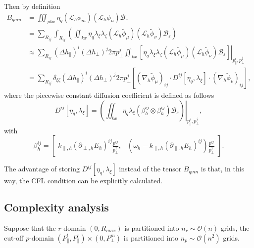 \documentclass{article}
\numberwithin{equation}{section}
\begin{document}
Then by definition
\begin{equation*}
    \begin{split}
        B_{qmn}
        &=\iiint_{pkx}\eta_{q}\left(\mathcal{L}_{h}\phi_{m}\right)\left(\mathcal{L}_{h}\phi_{n}\right)\mathcal{B}_{\varepsilon}\\
        &=\sum_{R_{ij}}\int_{R_{ij}}\left(\iint_{kx}\eta_{q}\lambda_{\xi}\lambda_{\zeta}\left(\mathcal{L}_{h}\tilde{\phi}_{\mu}\right)\left(\mathcal{L}_{h}\tilde{\phi}_{\nu}\right)\mathcal{B}_{\varepsilon}\right)\\
        &\approx\sum_{R_{ij}}\left(\Delta h_{\parallel}\right)^{i}\left(\Delta h_{\perp}\right)^{j}2\pi p_{\perp}^{j}\left.\iint_{kx}\left[\eta_{q}\lambda_{\xi}\lambda_{\zeta}\left(\mathcal{L}_{h}\tilde{\phi}_{\mu}\right)\left(\mathcal{L}_{h}\tilde{\phi}_{\nu}\right)\mathcal{B}_{\varepsilon}\right]\right\vert_{p_{\parallel}^{i},p_{\perp}^{j}}\\
        &=\sum_{R_{ij}}\delta_{\xi\zeta}\left(\Delta h_{\parallel}\right)^{i}\left(\Delta h_{\perp}\right)^{j}2\pi p_{\perp}^{j}\left[\left(\nabla_{h}\tilde{\phi}_{\mu}\right)_{ij}\cdot D^{ij}[\eta_{q},\lambda_{\xi}]\cdot\left(\nabla_{h}\tilde{\phi}_{\nu}\right)_{ij}\right],
    \end{split}
\end{equation*}
where the piecewise constant diffusion coefficient is defined as follows
\begin{equation*}
    D^{ij}[\eta_{q},\lambda_{\xi}]=\left.\left(\iint_{kx}\eta_{q}\lambda_{\xi}\left(\beta_{h}^{ij}\otimes\beta_{h}^{ij}\right)\mathcal{B}_{\varepsilon}\right)\right|_{p_{\parallel}^{i},p_{\perp}^{j}},
\end{equation*}
with
\begin{equation*}
    \beta_{h}^{ij}=\left[\begin{array}{cc}
k_{\parallel,h}\left(\partial_{\perp,h}E_{h}\right)^{ij}\frac{p^{ij}}{p_{\perp}^{j}}, & \left(\omega_{h}-k_{\parallel,h}\left(\partial_{\parallel,h}E_{h}\right)^{ij}\right)\frac{p^{ij}}{p_{\perp}^{j}}\end{array}\right].
\end{equation*}

The advantage of storing $D^{ij}[\eta_{q},\lambda_{\xi}]$ instead of the tensor $B_{qmn}$ is that, in this way, the CFL condition can be explicitly calculated.

\subsection{Complexity analysis}
Suppose that the $r$-domain $(0,R_{max})$ is partitioned into $n_{r}\sim \mathcal{O}(n)$ grids, the cut-off $p$-domain $(P^{l}_{\parallel},P^{r}_{\parallel})\times(0,P^{m}_{\perp})$ is partitioned into $n_{p}\sim \mathcal{O}(n^{2})$ grids. 
\end{document}
